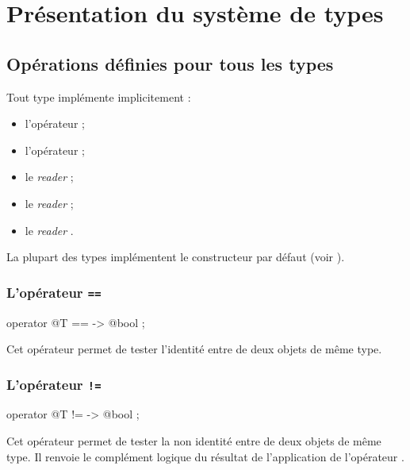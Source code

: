 
\chapter{Présentation du système de types}






\section{Opérations définies pour tous les types}

Tout type implémente implicitement :
\begin{itemize}
  \item l'opérateur \galgas{==} ;
  \item l'opérateur \galgas{\!=} ;
  \item le \emph{reader}  ;
  \item le \emph{reader}  ;
  \item le \emph{reader} .
\end{itemize}

La plupart des types implémentent le constructeur par défaut  (voir ). 


\subsection{L'opérateur \texttt{==}}

\begin{galgascode}
operator @T == -> @bool ;
\end{galgascode}

Cet opérateur permet de tester l'identité entre de deux objets de même type. 

\subsection{L'opérateur \texttt{!=}}

\begin{galgascode}
operator @T != -> @bool ;
\end{galgascode}

Cet opérateur permet de tester la non identité entre de deux objets de même type. Il renvoie le complément logique du résultat de l'application de l'opérateur \galgas{==}.





